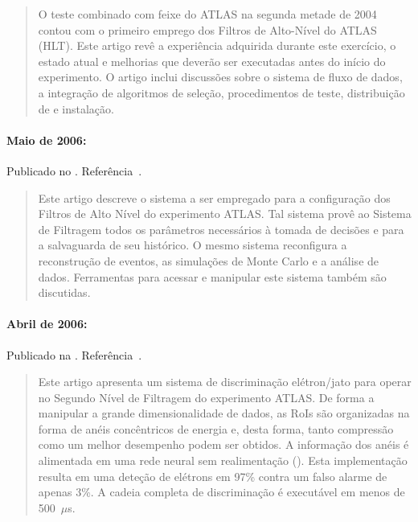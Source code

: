 \begin{quotation}
O teste combinado com feixe do ATLAS na segunda metade de 2004 contou com o
primeiro emprego dos Filtros de Alto-Nível do ATLAS (HLT). Este artigo revê a
experiência adquirida durante este exercício, o estado atual e melhorias que
deverão ser executadas antes do início do experimento. O artigo inclui
discussões sobre o sistema de fluxo de dados, a integração de algoritmos de
seleção, procedimentos de teste, distribuição de  e instalação.
\end{quotation}

\paragraph{Maio de 2006: } Publicado no . Referência~\cite{aa:jinst-06}.

\begin{quotation}
Este artigo descreve o sistema a ser empregado para a configuração dos Filtros
de Alto Nível do experimento ATLAS. Tal sistema provê ao Sistema de Filtragem
todos os parâmetros necessários à tomada de decisões e para a salvaguarda de
seu histórico. O mesmo sistema reconfigura a reconstrução de eventos, as
simulações de Monte Carlo e a análise de dados. Ferramentas para acessar e
manipular este sistema também são discutidas.
\end{quotation}

\paragraph{Abril de 2006: } Publicado na . Referência~\cite{aa:nim-06}.

\begin{quotation}
Este artigo apresenta um sistema de discriminação elétron/jato para operar no
Segundo Nível de Filtragem do experimento ATLAS. De forma a manipular a grande
dimensionalidade de dados, as RoIs são organizadas na forma de anéis
concêntricos de energia e, desta forma, tanto compressão como um melhor
desempenho podem ser obtidos. A informação dos anéis é alimentada em uma rede
neural sem realimentação (). Esta implementação resulta em
uma deteção de elétrons em 97\% contra um falso alarme de apenas 3\%. A cadeia
completa de discriminação é executável em menos de 500~$\mu$s.
\end{quotation}

